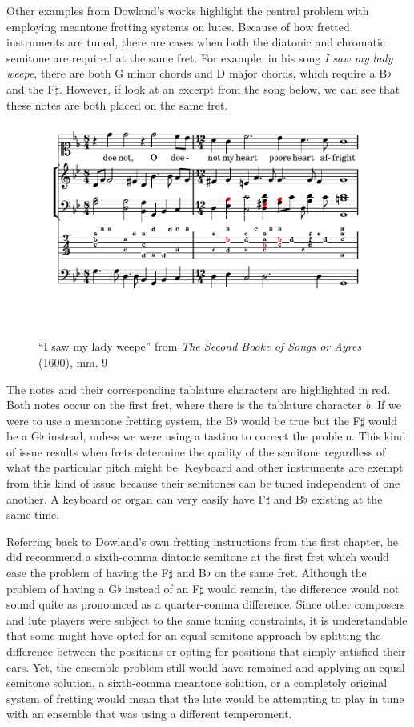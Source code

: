 Other examples from Dowland's works highlight the central problem with employing
meantone fretting systems on lutes.  Because of how fretted instruments are tuned,
there are cases when both the diatonic and chromatic semitone are required at the same
fret. For example, in his song \textit{I saw my lady weepe}, there are both G minor
chords and D major chords, which require a B$\flat$ and the F$\sharp$.   However, if
look at an excerpt from the song below, we can see that these notes are both placed on
the same fret.
\begin{figure}[h]
\centering
\includegraphics{examples/saw.pdf}
\label{dowland-saw}
\caption{``I saw my lady weepe'' from \textit{The Second Booke of Songs or Ayres} (1600), mm. 9}
\end{figure}
The notes and their corresponding tablature characters are highlighted in red.  Both
notes occur on the first fret, where there is the tablature character \textit{b}.  If
we were to use a meantone fretting system, the B$\flat$ would be true but the F$\sharp$
would be a G$\flat$ instead, unless we were using a tastino to correct the problem.
This kind of issue results when frets determine the quality of the semitone regardless
of what the particular pitch might be.  Keyboard and other instruments are exempt from
this kind of issue because their semitones can be tuned independent of one another.  A
keyboard or organ can very easily have F$\sharp$ and B$\flat$ existing at the same time.

Referring back to Dowland's own fretting instructions from the first chapter, he did
recommend a sixth-comma diatonic semitone at the first fret which would ease the
problem of having the F$\sharp$ and B$\flat$ on the same fret.  Although the problem of
having a G$\flat$ instead of an F$\sharp$ would remain, the difference would not sound
quite as pronounced as a quarter-comma difference.  Since other composers and lute
players were subject to the same tuning constraints, it is understandable that some
might have opted for an equal semitone approach by splitting the difference between the
positions or opting for positions that simply satisfied their ears. Yet, the ensemble
problem still would have remained and applying an equal semitone solution, a
sixth-comma meantone solution, or a completely original system of fretting would mean
that the lute would be attempting to play in tune with an ensemble that was using a
different temperament.

